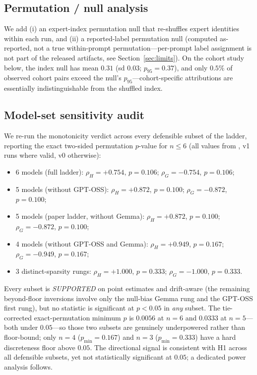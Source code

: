 \documentclass[sigconf]{acmart}
\begin{document}
\subsection{Permutation / null analysis}
We add (i) an expert-index permutation null that re-shuffles expert
identities within each run, and (ii) a reported-label permutation null
(computed as-reported, not a true within-prompt permutation---per-prompt
label assignment is not part of the released artifacts, see
Section~\ref{sec:limits}). On the cohort study below, the index null has
mean $0.31$ (sd $0.03$; $p_{95} = 0.37$), and only $0.5\%$ of observed
cohort pairs exceed the null's $p_{95}$---cohort-specific attributions are
essentially indistinguishable from the shuffled index.

\subsection{Model-set sensitivity audit}
\label{sec:verdict}
We re-run the monotonicity verdict across every defensible subset of the
ladder, reporting the exact two-sided permutation $p$-value for $n \le 6$
(all values from , v1 runs where valid,
v0 otherwise):
\begin{itemize}
\item 6 models (full ladder): $\rho_H = +0.754$, $p = 0.106$; $\rho_G = -0.754$, $p = 0.106$;
\item 5 models (without GPT-OSS): $\rho_H = +0.872$, $p = 0.100$; $\rho_G = -0.872$, $p = 0.100$;
\item 5 models (paper ladder, without Gemma): $\rho_H = +0.872$, $p = 0.100$; $\rho_G = -0.872$, $p = 0.100$;
\item 4 models (without GPT-OSS and Gemma): $\rho_H = +0.949$, $p = 0.167$; $\rho_G = -0.949$, $p = 0.167$;
\item 3 distinct-sparsity rungs: $\rho_H = +1.000$, $p = 0.333$; $\rho_G = -1.000$, $p = 0.333$.
\end{itemize}
Every subset is \emph{SUPPORTED} on point estimates and drift-aware (the
remaining beyond-floor inversions involve only the null-bias Gemma rung and
the GPT-OSS first rung), but no statistic is significant at $p < 0.05$ in
\emph{any} subset. The tie-corrected exact-permutation minimum $p$ is
$0.0056$ at $n=6$ and $0.0333$ at $n=5$---both under $0.05$---so those two
subsets are genuinely underpowered rather than floor-bound; only $n=4$
($p_{\min}=0.167$) and $n=3$ ($p_{\min}=0.333$) have a hard discreteness
floor above $0.05$. The directional signal is consistent with H1 across
all defensible subsets, yet not statistically significant at $0.05$; a
dedicated power analysis follows.
\end{document}
